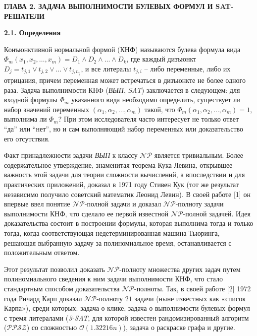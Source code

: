 \newpage
\begin{center}
\noindent\textbf{ГЛАВА 2. ЗАДАЧА ВЫПОЛНИМОСТИ БУЛЕВЫХ ФОРМУЛ И SAT-РЕШАТЕЛИ}\label{chapters:2}
\vspace{1.5mm}
\end{center}

\vspace{5pt}
\textbf{2.1. Определения}\label{chapters:2.1}
\vspace{5pt}

Конъюнктивной нормальной формой (КНФ) называются булева формула вида 
$\Phi_m \left( x_1, x_2, \dots, x_m \right) = D_1 \land D_2 \land \dots \land D_k$,
где каждый дизъюнкт $D_j=t_{j,1} \lor t_{j,2} \lor \dots \lor t_{j,n_j}$, 
и все литералы $t_{j,i}$ – либо переменные, либо их отрицания,
причем переменная может встречаться в дизъюнкте не более одного раза. 
Задача выполнимости КНФ (\textit{ВЫП}, \textit{SAT}) заключается в следующем: для входной формулы $\Phi_m$ указанного вида 
необходимо определить, существует ли набор значений переменных $\left( \alpha_1, \alpha_2, \dots, \alpha_m \right)$ такой,
что $\Phi_m \left( \alpha_1, \alpha_2, \dots, \alpha_m \right) = 1$, выполнима ли $\Phi_m$? 
При этом исследователя часто интересует не только ответ \enquote{да} или \enquote{нет}, но и сам выполняющий набор переменных или доказательство его отсутствия.

Факт принадлежности задачи \textit{ВЫП} к классу $\mathcal{NP}$ является тривиальным. Более содержательное утверждение, 
знаменитая теорема Кука-Левина, открывшее важность этой задачи для теории сложности вычислений, 
а впоследствии и для практических приложений, доказал в 1971 году Стивен Кук (тот же результат независимо получило советский математик Леонид Левин). В своей работе [1] он впервые ввел понятие $\mathcal{NP}$-полной задачи и доказал $\mathcal{NP}$-полноту 
задачи выполнимости КНФ, что сделало ее первой известной $\mathcal{NP}$-полной задачей. 
Идея доказательства состоит в построении формулы, которая выполнима тогда и только тогда, когда соответствующая 
недетерминированная машина Тьюринга, решающая выбранную задачу за полиномиальное время, останавливается с положительным ответом.

Этот результат позволил доказать $\mathcal{NP}$-полноту множества других задач путем полиномиального сведения к ним задачи выполнимости КНФ, что стало стандартным способом доказательства $\mathcal{NP}$-полноты. 
Так, в своей работе [2] 1972 года Ричард Карп доказал $\mathcal{NP}$-полноту $21$ задачи (ныне известных как «список Карпа»), 
среди которых: задача о клике, задача о выполнимости булевых формул с тремя литералами (\textit{3-SAT}, 
для которой известен рандомизированный алгоритм ($\mathcal{PPSZ}$) со сложностью $\mathcal{O} \left( 1.32216n \right)$), 
задача о раскраске графа и другие.

